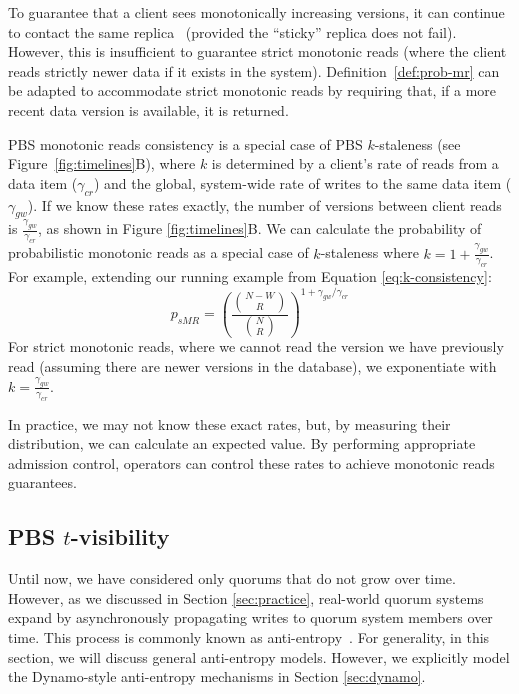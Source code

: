 \documentclass{vldb}
\newcommand{\subsectionskip}{-0em}
\begin{document}
To guarantee that a client sees monotonically increasing versions, it
can continue to contact the same replica~\cite{vogels-defs} (provided
the ``sticky'' replica does not fail).  However, this is insufficient to
guarantee strict monotonic reads (where the client reads strictly
newer data if it exists in the system).  Definition~\ref{def:prob-mr}
can be adapted to accommodate strict monotonic reads by requiring
that, if a more recent data version is available, it is returned.

PBS monotonic reads consistency is a special case of PBS $k$-staleness (see
Figure~\ref{fig:timelines}B), where $k$ is determined by a client's
rate of reads from a data item ($\gamma_{cr}$) and the global,
system-wide rate of writes to the same data item ($\gamma_{gw}$).  If
we know these rates exactly, the number of versions between client
reads is $\frac{\gamma_{gw}}{\gamma_{cr}}$, as shown in Figure
\ref{fig:timelines}B.  We can calculate the probability of
probabilistic monotonic reads as a special case of $k$-staleness where
$k=1+\frac{\gamma_{gw}}{\gamma_{cr}}$.  For example, extending our running example from Equation \ref{eq:k-consistency}:
\begin{equation}
\label{eq:prob-mr}
p_{sMR} = \left(\frac{{N-W \choose R}}{{N \choose R}}\right)^{1+\gamma_{gw}/\gamma_{cr}}
\end{equation}
For strict monotonic reads, where we cannot read the version we have
previously read (assuming there are newer versions in the database), we
exponentiate with $k=\frac{\gamma_{gw}}{\gamma_{cr}}$.

In practice, we may not know these exact rates, but, by measuring
their distribution, we can calculate an expected value.  By performing
appropriate admission control, operators can control these rates to
achieve monotonic reads guarantees.

\vspace{\subsectionskip}\subsection{PBS $t$-visibility}
\label{sec:tvis}

Until now, we have considered only quorums that do not grow over time.
However, as we discussed in Section \ref{sec:practice}, real-world
quorum systems expand by asynchronously propagating writes to quorum
system members over time.  This process is commonly known as
anti-entropy~\cite{antientropy}.  For generality, in this section, we
will discuss general anti-entropy models. However, we explicitly model
the Dynamo-style anti-entropy mechanisms in Section \ref{sec:dynamo}.
\end{document}
